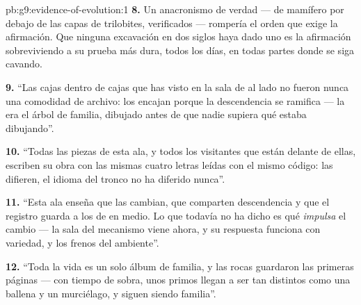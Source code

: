 \begin{solution}{pb:g9:evidence-of-evolution:1}
\textbf{8.} Un anacronismo de verdad ---  de mamífero por debajo
de las capas de trilobites, verificados --- rompería el orden que exige
la afirmación. Que ninguna excavación en dos siglos haya dado uno es la
afirmación sobreviviendo a su prueba más dura, todos los días, en todas
partes donde se siga cavando.

\textbf{9.} ``Las cajas dentro de cajas que has visto en la sala de al
lado no fueron nunca una comodidad de archivo: los  encajan
porque la descendencia se ramifica --- la  era el árbol de
familia, dibujado antes de que nadie supiera qué estaba dibujando''.

\textbf{10.} ``Todas las piezas de esta ala, y todos los visitantes que
están delante de ellas, escriben su obra con las mismas cuatro letras
leídas con el mismo código: las  difieren, el idioma del tronco no
ha diferido nunca''.

\textbf{11.} ``Esta ala enseña que las  cambian, que comparten
descendencia y que el registro guarda a los de en medio. Lo que
todavía no ha dicho es qué \emph{impulsa} el cambio --- la sala del
mecanismo viene ahora, y su respuesta funciona con variedad,  y
los frenos del ambiente''.

\textbf{12.} ``Toda la vida es un solo álbum de familia, y las rocas
guardaron las primeras páginas --- con tiempo de sobra, unos primos
llegan a ser tan distintos como una ballena y un murciélago, y siguen
siendo familia''.
\end{solution}
